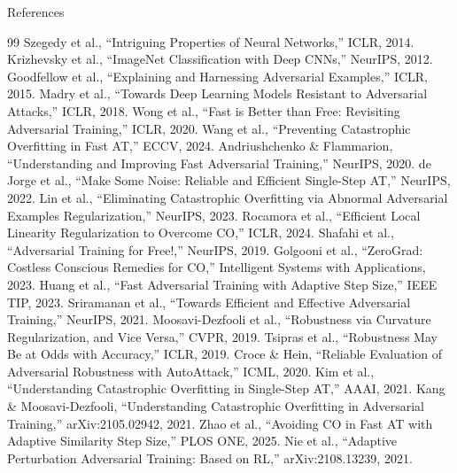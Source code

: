 \documentclass[11pt,aspectratio=169]{beamer}
\begin{document}
\begin{frame}[allowframebreaks]{References}
  \footnotesize
  \begin{thebibliography}{99}
     Szegedy et al., ``Intriguing Properties of Neural Networks,'' ICLR, 2014.
     Krizhevsky et al., ``ImageNet Classification with Deep CNNs,'' NeurIPS, 2012.
     Goodfellow et al., ``Explaining and Harnessing Adversarial Examples,'' ICLR, 2015.
     Madry et al., ``Towards Deep Learning Models Resistant to Adversarial Attacks,'' ICLR, 2018.
     Wong et al., ``Fast is Better than Free: Revisiting Adversarial Training,'' ICLR, 2020.
     Wang et al., ``Preventing Catastrophic Overfitting in Fast AT,'' ECCV, 2024.
     Andriushchenko \& Flammarion, ``Understanding and Improving Fast Adversarial Training,'' NeurIPS, 2020.
     de Jorge et al., ``Make Some Noise: Reliable and Efficient Single-Step AT,'' NeurIPS, 2022.
     Lin et al., ``Eliminating Catastrophic Overfitting via Abnormal Adversarial Examples Regularization,'' NeurIPS, 2023.
     Rocamora et al., ``Efficient Local Linearity Regularization to Overcome CO,'' ICLR, 2024.
     Shafahi et al., ``Adversarial Training for Free!,'' NeurIPS, 2019.
     Golgooni et al., ``ZeroGrad: Costless Conscious Remedies for CO,'' Intelligent Systems with Applications, 2023.
     Huang et al., ``Fast Adversarial Training with Adaptive Step Size,'' IEEE TIP, 2023.
     Sriramanan et al., ``Towards Efficient and Effective Adversarial Training,'' NeurIPS, 2021.
     Moosavi-Dezfooli et al., ``Robustness via Curvature Regularization, and Vice Versa,'' CVPR, 2019.
     Tsipras et al., ``Robustness May Be at Odds with Accuracy,'' ICLR, 2019.
     Croce \& Hein, ``Reliable Evaluation of Adversarial Robustness with AutoAttack,'' ICML, 2020.
     Kim et al., ``Understanding Catastrophic Overfitting in Single-Step AT,'' AAAI, 2021.
     Kang \& Moosavi-Dezfooli, ``Understanding Catastrophic Overfitting in Adversarial Training,'' arXiv:2105.02942, 2021.
     Zhao et al., ``Avoiding CO in Fast AT with Adaptive Similarity Step Size,'' PLOS ONE, 2025.
     Nie et al., ``Adaptive Perturbation Adversarial Training: Based on RL,'' arXiv:2108.13239, 2021.
  \end{thebibliography}
\end{frame}
\end{document}
